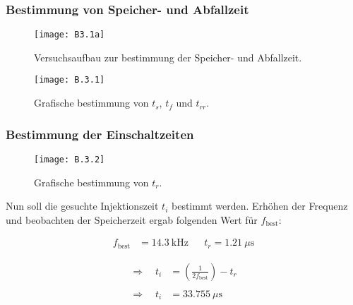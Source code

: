 \documentclass[
	a4paper, %
	12pt, %
]{CSUniSchoolLabReport}
\newcommand{\micro}{\ensuremath{\mu}}
\begin{document}
\subsubsection{Bestimmung von Speicher- und Abfallzeit}

\begin{figure}[H] %
	\centering %
	\texttt{[image: B3.1a]} %
	\caption{Versuchsaufbau zur bestimmung der Speicher- und Abfallzeit.}
	\vspace{1em}
\end{figure}

\begin{figure}[H] %
	\centering %
	\texttt{[image: B.3.1]} %
	\caption{Grafische bestimmung von $t_s$, $t_f$ und $t_{rr}$.}
\end{figure}

\subsubsection{Bestimmung der Einschaltzeiten}
\begin{figure}[H] %
	\centering %
	\texttt{[image: B.3.2]} %
	\caption{Grafische bestimmung von $t_r$.}
	\vspace{1em}
\end{figure}

Nun soll die gesuchte Injektionszeit $t_i$ bestimmt werden. Erhöhen der Frequenz und beobachten der Speicherzeit ergab folgenden Wert für $f_{\text{best}}$: 

\begin{align*}
    f_{\text{best}} &= \SI{14,3}{\kilo\hertz} 
    && t_r = \SI{1,21}{\micro\second}
\end{align*}

\begin{align*}
	\Rightarrow\quad 
    t_i &= \left(\frac{1}{2 f_{\text{best}}}\right) - t_r \\ \\
    \Rightarrow\quad
    t_i &= \SI{33,755}{\micro\second}
\end{align*}
\end{document}
